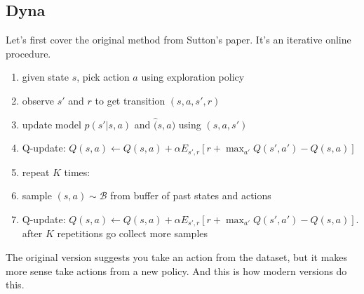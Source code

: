 \documentclass{report}
\begin{document}
\subsection{Dyna}
Let's first cover the original method from Sutton's paper.
It's an iterative online procedure.
\begin{enumerate}
		\item given state $s$, pick action $a$ using exploration policy
		\item observe $s'$ and $r$ to get transition $(s,a,s',r) $
		\item update model $\hat{p}(s'|s,a)$ and $\hat(s,a)$ using $(s,a,s')$
		\item Q-update: $Q(s,a) \leftarrow Q(s,a) + \alpha E_{s',r} \left[ r+ \max_{a'} Q(s',a') - Q(s,a) \right] $
		\item repeat $K$ times:
		\item sample $(s,a) \sim \mathcal{B}$ from buffer of past states and actions
		\item Q-update: $Q(s,a) \leftarrow Q(s,a) + \alpha E_{s',r} \left[ r+ \max_{a'} Q(s',a') - Q(s,a) \right] $. after $K $ repetitions go
				collect more samples
\end{enumerate}
The original version suggests you take an action from the dataset, but it makes more sense take actions from a new policy.
And this is how modern versions do this.
\end{document}
